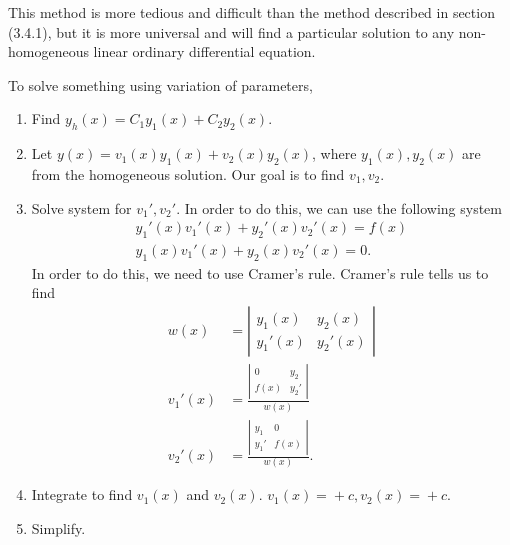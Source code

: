   This method is more tedious and difficult than the method described in section (3.4.1), but it is more universal and will find a particular solution to any non-homogeneous linear ordinary differential equation.
  \begin{theorem}
    To solve something using variation of parameters,
    \begin{enumerate}
      \item Find $y_h(x)=C_1y_1(x)+C_2y_2(x)$.
      \item Let $y(x)=v_1(x)y_1(x)+v_2(x)y_2(x)$, where $y_1(x),y_2(x)$ are from the homogeneous solution. Our goal is to find $v_1,v_2$.
      \item Solve system for $v_1',v_2'$. In order to do this, we can use the following system 
        \begin{align*}
          y_1'(x)v_1'(x)+y_2'(x)v_2'(x)=f(x)\\
          y_1(x)v_1'(x)+y_2(x)v_2'(x)=0
        .\end{align*}
        In order to do this, we need to use Cramer's rule. Cramer's rule tells us to find 
        \begin{align*}
          w(x)&=\left| \begin{matrix} y_1(x)&y_2(x)\\y_1'(x)&y_2'(x) \end{matrix} \right|\\
          v_1'(x)&= \frac{\left| \begin{matrix} 0&y_2\\f(x)&y_2' \end{matrix} \right|}{w(x)} \\
          v_2'(x)&=\frac{\left| \begin{matrix} y_1&0\\y_1'&f(x) \end{matrix} \right| }{w(x)}
        .\end{align*}
      \item Integrate to find $v_1(x)$ and $v_2(x)$. $v_1(x)=\boxed{}+c,v_2(x)=\boxed{}+c$.
      \item Simplify.
    \end{enumerate}
  \end{theorem}

